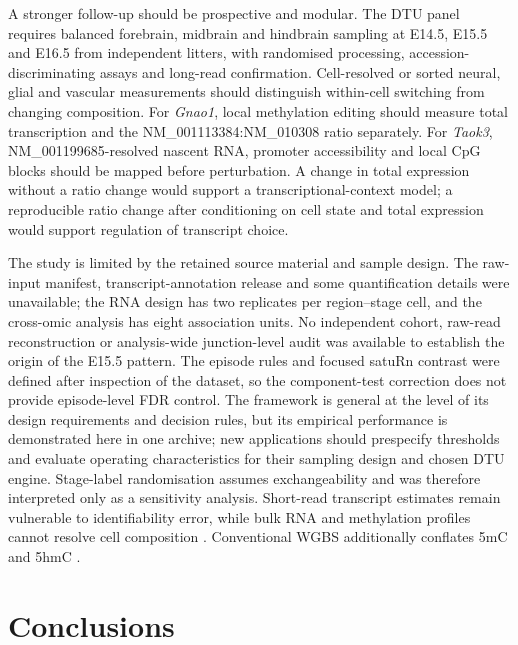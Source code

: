 \documentclass[11pt,a4paper]{article}
\begin{document}
A stronger follow-up should be prospective and modular. The DTU panel requires balanced forebrain, midbrain and hindbrain sampling at E14.5, E15.5 and E16.5 from independent litters, with randomised processing, accession-discriminating assays and long-read confirmation. Cell-resolved or sorted neural, glial and vascular measurements should distinguish within-cell switching from changing composition. For \textit{Gnao1}, local methylation editing should measure total transcription and the NM\_001113384:NM\_010308 ratio separately. For \textit{Taok3}, NM\_001199685-resolved nascent RNA, promoter accessibility and local CpG blocks should be mapped before perturbation. A change in total expression without a ratio change would support a transcriptional-context model; a reproducible ratio change after conditioning on cell state and total expression would support regulation of transcript choice.

The study is limited by the retained source material and sample design. The raw-input manifest, transcript-annotation release and some quantification details were unavailable; the RNA design has two replicates per region--stage cell, and the cross-omic analysis has eight association units. No independent cohort, raw-read reconstruction or analysis-wide junction-level audit was available to establish the origin of the E15.5 pattern. The episode rules and focused satuRn contrast were defined after inspection of the dataset, so the component-test correction does not provide episode-level FDR control. The framework is general at the level of its design requirements and decision rules, but its empirical performance is demonstrated here in one archive; new applications should prespecify thresholds and evaluate operating characteristics for their sampling design and chosen DTU engine. Stage-label randomisation assumes exchangeability and was therefore interpreted only as a sensitivity analysis. Short-read transcript estimates remain vulnerable to identifiability error, while bulk RNA and methylation profiles cannot resolve cell composition \citep{leung_cortex_isoforms_2021,la_manno_brain_atlas_2021,lio_dtu_benchmark_2025,liu_single_cell_methylome_2021}. Conventional WGBS additionally conflates 5mC and 5hmC \citep{huang_bisulfite_5hmc_2010,lister_brain_methylome_2013}.

\section{Conclusions}
\end{document}
